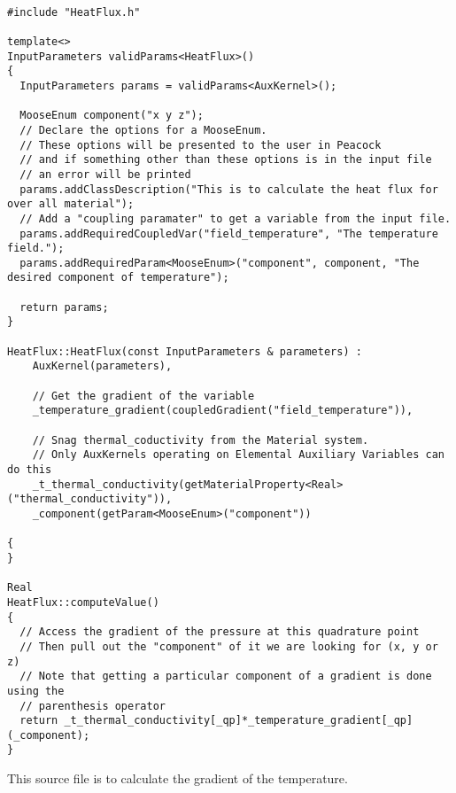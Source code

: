 \begin{lstlisting}

#include "HeatFlux.h"

template<>
InputParameters validParams<HeatFlux>()
{
  InputParameters params = validParams<AuxKernel>();

  MooseEnum component("x y z");
  // Declare the options for a MooseEnum.
  // These options will be presented to the user in Peacock
  // and if something other than these options is in the input file
  // an error will be printed
  params.addClassDescription("This is to calculate the heat flux for over all material");
  // Add a "coupling paramater" to get a variable from the input file.
  params.addRequiredCoupledVar("field_temperature", "The temperature field.");
  params.addRequiredParam<MooseEnum>("component", component, "The desired component of temperature");

  return params;
}

HeatFlux::HeatFlux(const InputParameters & parameters) :
    AuxKernel(parameters),

    // Get the gradient of the variable
    _temperature_gradient(coupledGradient("field_temperature")),

    // Snag thermal_coductivity from the Material system.
    // Only AuxKernels operating on Elemental Auxiliary Variables can do this
    _t_thermal_conductivity(getMaterialProperty<Real>("thermal_conductivity")),
	_component(getParam<MooseEnum>("component"))

{
}

Real
HeatFlux::computeValue()
{
  // Access the gradient of the pressure at this quadrature point
  // Then pull out the "component" of it we are looking for (x, y or z)
  // Note that getting a particular component of a gradient is done using the
  // parenthesis operator
  return _t_thermal_conductivity[_qp]*_temperature_gradient[_qp](_component);
}
\end{lstlisting}
\pagebreak
This source file is to calculate the gradient of the temperature.
\lstset{style=cpp}

